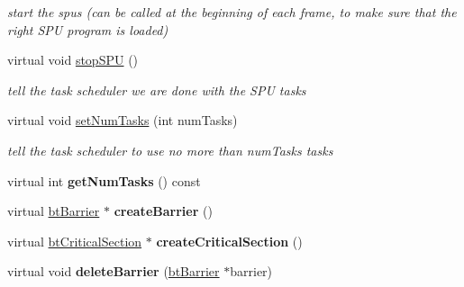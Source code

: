 \begin{DoxyCompactItemize}
\begin{DoxyCompactList}\small\item\em start the spus (can be called at the beginning of each frame, to make sure that the right S\+P\+U program is loaded) \end{DoxyCompactList}\item 
\hypertarget{class_posix_thread_support_a42e31438ebcd31bce0ea15e3c16f5881}{virtual void \hyperlink{class_posix_thread_support_a42e31438ebcd31bce0ea15e3c16f5881}{stop\+S\+P\+U} ()}\label{class_posix_thread_support_a42e31438ebcd31bce0ea15e3c16f5881}

\begin{DoxyCompactList}\small\item\em tell the task scheduler we are done with the S\+P\+U tasks \end{DoxyCompactList}\item 
\hypertarget{class_posix_thread_support_a8036f513f0c6f9116b60cafa021a9a1f}{virtual void \hyperlink{class_posix_thread_support_a8036f513f0c6f9116b60cafa021a9a1f}{set\+Num\+Tasks} (int num\+Tasks)}\label{class_posix_thread_support_a8036f513f0c6f9116b60cafa021a9a1f}

\begin{DoxyCompactList}\small\item\em tell the task scheduler to use no more than num\+Tasks tasks \end{DoxyCompactList}\item 
\hypertarget{class_posix_thread_support_a1f50b2187d57b6f3a2032f03985362d8}{virtual int {\bfseries get\+Num\+Tasks} () const }\label{class_posix_thread_support_a1f50b2187d57b6f3a2032f03985362d8}

\item 
\hypertarget{class_posix_thread_support_af7a49d2d846b1240055edc7b314ce30b}{virtual \hyperlink{classbt_barrier}{bt\+Barrier} $\ast$ {\bfseries create\+Barrier} ()}\label{class_posix_thread_support_af7a49d2d846b1240055edc7b314ce30b}

\item 
\hypertarget{class_posix_thread_support_aec07e6694368496f0e0e723fabc99c36}{virtual \hyperlink{classbt_critical_section}{bt\+Critical\+Section} $\ast$ {\bfseries create\+Critical\+Section} ()}\label{class_posix_thread_support_aec07e6694368496f0e0e723fabc99c36}

\item 
\hypertarget{class_posix_thread_support_a6e9f1aac4898126e0fb597ab07bd4b00}{virtual void {\bfseries delete\+Barrier} (\hyperlink{classbt_barrier}{bt\+Barrier} $\ast$barrier)}\label{class_posix_thread_support_a6e9f1aac4898126e0fb597ab07bd4b00}


\end{DoxyCompactItemize}
